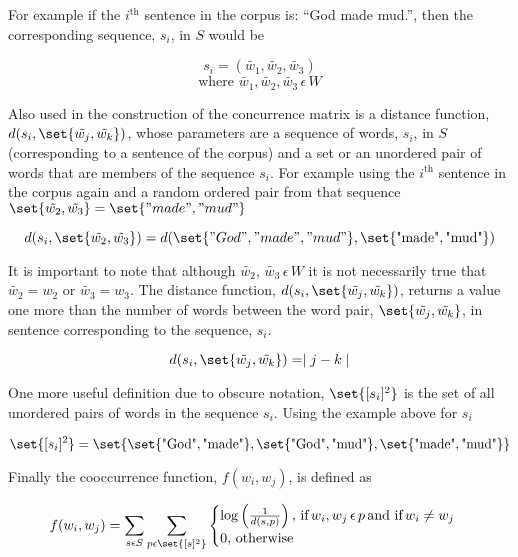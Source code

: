 \documentclass{article}
\begin{document}
For example if the $i^{\text{th}}$ sentence in the corpus is: ``God made mud.'', then the corresponding sequence, $s_i$, in $S$ would be

\begin{equation*}
s_i = \left( \tilde{w_1}, \tilde{w_2}, \tilde{w_3} \right)
\end{equation*}
\begin{equation*}
\text{where } \tilde{w_1}, \tilde{w_2}, \tilde{w_3} \, \epsilon \, W
\end{equation*}

Also used in the construction of the concurrence matrix is a distance function, $d(s_i, \set{\tilde{w_j}, \tilde{w_k}})$, whose parameters are a sequence of words, $s_i$, in $S$ (corresponding to a sentence of the corpus) and a set or an unordered pair of words that are members of the sequence $s_i$. For example using the $i^{\text{th}}$ sentence in the corpus again and a random ordered pair from that sequence $\set{\tilde{w_2}, \tilde{w_3}} = \set{"made", "mud"}$

\begin{equation*}
d(s_i, \set{\tilde{w_2}, \tilde{w_3}}) = d(\set{"God", "made", "mud"}, \set{\text{"made"}, \text{"mud"}})
\end{equation*}


It is important to note that although $\tilde{w_2}$, $\tilde{w_3} \, \epsilon \, W$ it is not necessarily true that $\tilde{w_2} = w_2$ or $\tilde{w_3} = w_3$. The distance function, $d(s_i, \set{\tilde{w_j}, \tilde{w_k}})$, returns a value one more than the number of words between the word pair, $\set{\tilde{w_j}, \tilde{w_k}}$, in sentence corresponding to the sequence, $s_i$.

\begin{equation*}
d(s_i, \set{\tilde{w_j}, \tilde{w_k}}) = \mid j - k \mid
\end{equation*}

One more useful definition due to obscure notation, $\set{[s_i]^2}$ is the set of all unordered pairs of words in the sequence $s_i$. Using the example above for $s_i$

\begin{equation*}
\set{[s_i]^2} = \set{\set{\text{"God"}, \text{"made"}}, \set{\text{"God"}, \text{"mud"}}, \set{\text{"made"}, \text{"mud"}} }
\end{equation*}

Finally the cooccurrence function, $f(w_i, w_j)$, is defined as

\begin{equation*}
f(w_i,w_j) = 
\sum_{s \epsilon S} { \sum_{p \epsilon \set{[s]^2} } {
\begin{cases}
\log \left(\frac{1}{d(s,p)} \right), \, \text{if} \, w_i, w_j \, \epsilon \, p \, \text{and if} \, w_i \neq w_j
\\
0, \, \text{otherwise}
\end{cases}
} }
\end{equation*}
\end{document}
